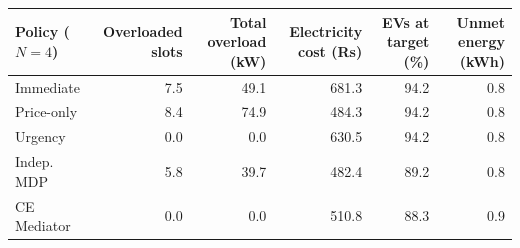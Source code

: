 \begin{tabular}{lrrrrr}
\toprule
Policy ($N=4$) & Overloaded slots & Total overload (kW) & Electricity cost (Rs) & EVs at target (\%) & Unmet energy (kWh) \\
\midrule
        Immediate & 7.5 & 49.1 & 681.3 & 94.2 & 0.8 \\
        Price-only & 8.4 & 74.9 & 484.3 & 94.2 & 0.8 \\
        Urgency & 0.0 & 0.0 & 630.5 & 94.2 & 0.8 \\
        Indep. MDP & 5.8 & 39.7 & 482.4 & 89.2 & 0.8 \\
        CE Mediator & 0.0 & 0.0 & 510.8 & 88.3 & 0.9 \\
\bottomrule
\end{tabular}
